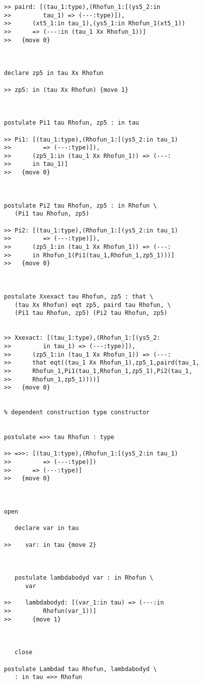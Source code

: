 \documentclass[12pt]{article}
\begin{document}
\begin{verbatim}
>> paird: [(tau_1:type),(Rhofun_1:[(ys5_2:in
>>         tau_1) => (---:type)]),
>>      (xt5_1:in tau_1),(ys5_1:in Rhofun_1(xt5_1))
>>      => (---:in (tau_1 Xx Rhofun_1))]
>>   {move 0}



declare zp5 in tau Xx Rhofun

>> zp5: in (tau Xx Rhofun) {move 1}



postulate Pi1 tau Rhofun, zp5 : in tau

>> Pi1: [(tau_1:type),(Rhofun_1:[(ys5_2:in tau_1)
>>         => (---:type)]),
>>      (zp5_1:in (tau_1 Xx Rhofun_1)) => (---:
>>      in tau_1)]
>>   {move 0}



postulate Pi2 tau Rhofun, zp5 : in Rhofun \
   (Pi1 tau Rhofun, zp5)

>> Pi2: [(tau_1:type),(Rhofun_1:[(ys5_2:in tau_1)
>>         => (---:type)]),
>>      (zp5_1:in (tau_1 Xx Rhofun_1)) => (---:
>>      in Rhofun_1(Pi1(tau_1,Rhofun_1,zp5_1)))]
>>   {move 0}



postulate Xxexact tau Rhofun, zp5 : that \
   (tau Xx Rhofun) eqt zp5, paird tau Rhofun, \
   (Pi1 tau Rhofun, zp5) (Pi2 tau Rhofun, zp5)


>> Xxexact: [(tau_1:type),(Rhofun_1:[(ys5_2:
>>         in tau_1) => (---:type)]),
>>      (zp5_1:in (tau_1 Xx Rhofun_1)) => (---:
>>      that eqt((tau_1 Xx Rhofun_1),zp5_1,paird(tau_1,
>>      Rhofun_1,Pi1(tau_1,Rhofun_1,zp5_1),Pi2(tau_1,
>>      Rhofun_1,zp5_1))))]
>>   {move 0}


% dependent construction type constructor


postulate =>> tau Rhofun : type

>> =>>: [(tau_1:type),(Rhofun_1:[(ys5_2:in tau_1)
>>         => (---:type)])
>>      => (---:type)]
>>   {move 0}



open

   declare var in tau

>>    var: in tau {move 2}



   postulate lambdabodyd var : in Rhofun \
      var

>>    lambdabodyd: [(var_1:in tau) => (---:in
>>         Rhofun(var_1))]
>>      {move 1}



   close

postulate Lambdad tau Rhofun, lambdabodyd \
   : in tau =>> Rhofun


\end{verbatim}
\end{document}

